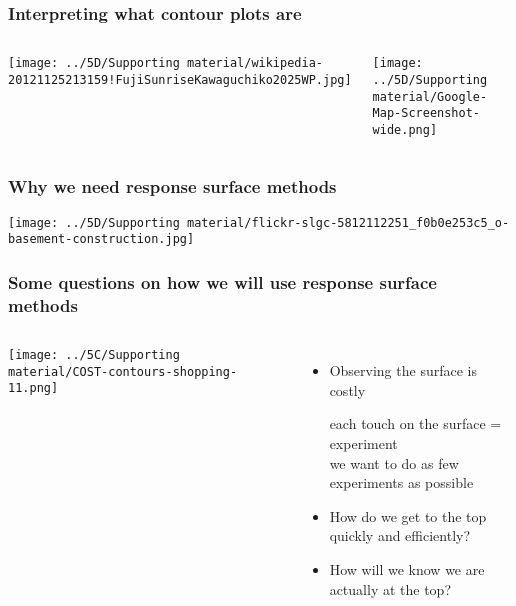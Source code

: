 \begin{frame}\frametitle{Interpreting what contour plots are}
	\begin{columns}[b]
			\centerline{\texttt{[image: ../5D/Supporting material/wikipedia-20121125213159!FujiSunriseKawaguchiko2025WP.jpg]}}
			
		
			\centerline{\texttt{[image: ../5D/Supporting material/Google-Map-Screenshot-wide.png]}}

	\end{columns}
	
\end{frame}

\begin{frame}\frametitle{Why we need response surface methods}
	\centerline{\texttt{[image: ../5D/Supporting material/flickr-slgc-5812112251\_f0b0e253c5\_o-basement-construction.jpg]}}
\end{frame}

\begin{frame}\frametitle{Some questions on how we will use response surface methods }
	\begin{columns}[c]
			\centerline{\texttt{[image: ../5C/Supporting material/COST-contours-shopping-11.png]}}

			\begin{itemize}
				\item	Observing the surface is costly
						
						\hspace{1ex} {\scriptsize each touch on the surface = experiment }\\
						\hspace{1ex} {\scriptsize we want to do as few experiments as possible }
				\pause
				\item	How do we get to the top quickly and efficiently?
				
				\pause
				\item	How will we know we are actually at the top?
			\end{itemize}
	\end{columns}
	
\end{frame}


